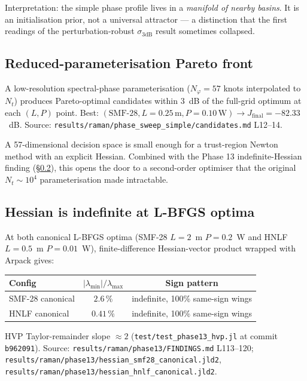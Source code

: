 \documentclass[12pt,a4paper]{article}
\theoremstyle{definition}
\begin{document}
Interpretation: the simple phase profile lives in a \emph{manifold of
nearby basins}. It is an initialisation prior, not a universal
attractor --- a distinction that the first readings of the
perturbation-robust $\sigma_{3\text{dB}}$ result sometimes collapsed.

\subsection{Reduced-parameterisation Pareto front}
\label{sec:april-pareto}

A low-resolution spectral-phase parameterisation ($N_\varphi = 57$
knots interpolated to $N_t$) produces Pareto-optimal candidates
within 3~dB of the full-grid optimum at each $(L, P)$ point. Best:
$(\text{SMF-28}, L=0.25\,\mathrm{m}, P=0.10\,\mathrm{W}) \to
J_\text{final} = -82.33$~dB. Source:
\texttt{results/raman/phase\_sweep\_simple/candidates.md} L12--14.

\begin{advisory}
A 57-dimensional decision space is small enough for a trust-region
Newton method with an explicit Hessian. Combined with the
Phase 13 indefinite-Hessian finding (§\ref{sec:april-hessian}), this
opens the door to a second-order optimiser that the original
$N_t \sim 10^4$ parameterisation made intractable.
\end{advisory}

\subsection{Hessian is indefinite at L-BFGS optima}
\label{sec:april-hessian}

At both canonical L-BFGS optima (SMF-28 $L{=}2$~m $P{=}0.2$~W and
HNLF $L{=}0.5$~m $P{=}0.01$~W), finite-difference Hessian-vector
product wrapped with Arpack gives:
\begin{center}
\begin{tabular}{lcc}
\toprule
Config & $|\lambda_\text{min}|/\lambda_\text{max}$ & Sign pattern \\
\midrule
SMF-28 canonical & $2.6\,\%$  & indefinite, 100\% same-sign wings \\
HNLF canonical   & $0.41\,\%$ & indefinite, 100\% same-sign wings \\
\bottomrule
\end{tabular}
\end{center}
HVP Taylor-remainder slope $\approx 2$ (\texttt{test/test\_phase13\_hvp.jl}
at commit \texttt{b962091}). Source:
\texttt{results/raman/phase13/FINDINGS.md} L113--120;
\texttt{results/raman/phase13/hessian\_smf28\_canonical.jld2},
\texttt{results/raman/phase13/hessian\_hnlf\_canonical.jld2}.
\end{document}
